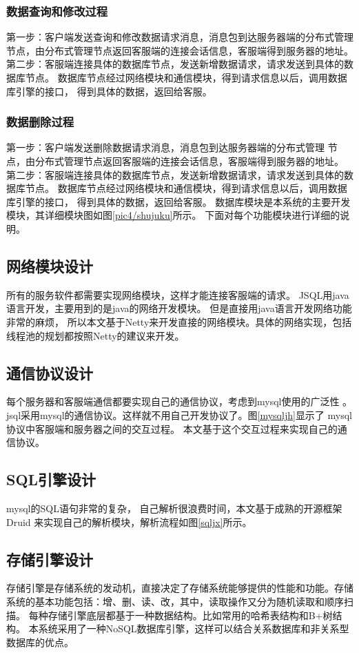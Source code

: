 \subsubsection{数据查询和修改过程}
第一步：客户端发送查询和修改数据请求消息，消息包到达服务器端的分布式管理
节点，由分布式管理节点返回客服端的连接会话信息，客服端得到服务器的地址。
第二步：客服端连接具体的数据库节点，发送新增数据请求，请求发送到具体的数据库节点。
数据库节点经过网络模块和通信模块，得到请求信息以后，调用数据库引擎的接口，
得到具体的数据，返回给客服。
\subsubsection{数据删除过程}
第一步：客户端发送删除数据请求消息，消息包到达服务器端的分布式管理
节点，由分布式管理节点返回客服端的连接会话信息，客服端得到服务器的地址。
第二步：客服端连接具体的数据库节点，发送新增数据请求，请求发送到具体的数据库节点。
数据库节点经过网络模块和通信模块，得到请求信息以后，调用数据库引擎的接口，
得到具体的数据，返回给客服。
数据库模块是本系统的主要开发模块，其详细模块图如图\ref{pic4/shujuku}所示。
下面对每个功能模块进行详细的说明。
\subsection{网络模块设计}
所有的服务软件都需要实现网络模块，这样才能连接客服端的请求。
JSQL用java语言开发，主要用到的是java的网络开发模块。
但是直接用java语言开发网络功能非常的麻烦，
所以本文基于Netty来开发直接的网络模块。具体的网络实现，包括
线程池的规划都按照Netty的建议来开发。
\subsection{通信协议设计}
每个服务器和客服端通信都要实现自己的通信协议，考虑到mysql使用的广泛性
。jsql采用mysql的通信协议。这样就不用自己开发协议了。图\ref{mysqljh}显示了
mysql协议中客服端和服务器之间的交互过程。
本文基于这个交互过程来实现自己的通信协议。
\subsection{SQL引擎设计}
mysql的SQL语句非常的复杂，
自己解析很浪费时间，本文基于成熟的开源框架Druid
来实现自己的解析模块，解析流程如图\ref{sqljx}所示。
\subsection{存储引擎设计}
存储引擎是存储系统的发动机，直接决定了存储系统能够提供的性能和功能。存储
系统的基本功能包括：增、删、读、改，其中，读取操作又分为随机读取和顺序扫描。
每种存储引擎底层都基于一种数据结构。比如常用的哈希表结构和B+树结构。
本系统采用了一种NoSQL数据库引擎，这样可以结合关系数据库和非关系型数据库的优点。
